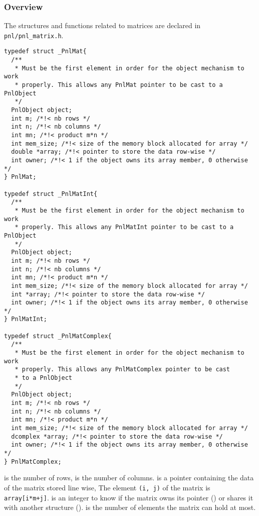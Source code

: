 \subsubsection{Overview}

The structures and functions related to matrices are declared in
\verb!pnl/pnl_matrix.h!.

\begin{verbatim}
typedef struct _PnlMat{
  /**
   * Must be the first element in order for the object mechanism to work
   * properly. This allows any PnlMat pointer to be cast to a PnlObject
   */
  PnlObject object; 
  int m; /*!< nb rows */ 
  int n; /*!< nb columns */ 
  int mn; /*!< product m*n */
  int mem_size; /*!< size of the memory block allocated for array */
  double *array; /*!< pointer to store the data row-wise */
  int owner; /*!< 1 if the object owns its array member, 0 otherwise */
} PnlMat;

typedef struct _PnlMatInt{
  /**
   * Must be the first element in order for the object mechanism to work
   * properly. This allows any PnlMatInt pointer to be cast to a PnlObject
   */
  PnlObject object; 
  int m; /*!< nb rows */ 
  int n; /*!< nb columns */ 
  int mn; /*!< product m*n */
  int mem_size; /*!< size of the memory block allocated for array */
  int *array; /*!< pointer to store the data row-wise */
  int owner; /*!< 1 if the object owns its array member, 0 otherwise */
} PnlMatInt;

typedef struct _PnlMatComplex{
  /**
   * Must be the first element in order for the object mechanism to work
   * properly. This allows any PnlMatComplex pointer to be cast 
   * to a PnlObject
   */
  PnlObject object; 
  int m; /*!< nb rows */ 
  int n; /*!< nb columns */ 
  int mn; /*!< product m*n */
  int mem_size; /*!< size of the memory block allocated for array */
  dcomplex *array; /*!< pointer to store the data row-wise */
  int owner; /*!< 1 if the object owns its array member, 0 otherwise */
} PnlMatComplex;
\end{verbatim}
 is the number of rows,  is the number of columns. 
is a pointer containing the data of the matrix stored line wise, The element
\verb!(i, j)! of the matrix is \verb!array[i*m+j]!.  is an integer to
know if the matrix owns its  pointer () or shares it
with another structure ().  is the number of
elements the matrix can hold at most.

